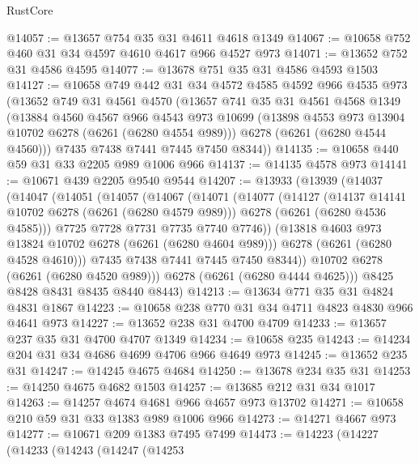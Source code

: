 \begin{lexlean}{RustCore}
\begin{coremodule}
@14057 := @13657 @754 @35 @31 @4611 @4618 @1349
@14067 := @10658 @752 @460 @31 @34 @4597 @4610 @4617 @966 @4527 @973
@14071 := @13652 @752 @31 @4586 @4595
@14077 := @13678 @751 @35 @31 @4586 @4593 @1503
@14127 := @10658
    @749
    @442
    @31
    @34
    @4572
    @4585
    @4592
    @966
    @4535
    @973
    (@13652
      @749
      @31
      @4561
      @4570
      (@13657
        @741
        @35
        @31
        @4561
        @4568
        @1349
        (@13884
          @4560
          @4567
          @966
          @4543
          @973
          @10699
          (@13898 @4553 @973 @13904 @10702 @6278 (@6261 (@6280 @4554 @989)))
          @6278
          (@6261 (@6280 @4544 @4560)))
        @7435
        @7438
        @7441
        @7445
        @7450
        @8344))
@14135 := @10658 @440 @59 @31 @33 @2205 @989 @1006 @966
@14137 := @14135 @4578 @973
@14141 := @10671 @439 @2205 @9540 @9544
@14207 := @13933
    (@13939
      (@14037
        (@14047
          (@14051
            (@14057
              (@14067
                (@14071
                  (@14077
                    (@14127
                      (@14137 @14141 @10702 @6278 (@6261 (@6280 @4579 @989)))
                      @6278
                      (@6261 (@6280 @4536 @4585)))
                    @7725
                    @7728
                    @7731
                    @7735
                    @7740
                    @7746))
                (@13818 @4603 @973 @13824 @10702 @6278 (@6261 (@6280 @4604 @989)))
                @6278
                (@6261 (@6280 @4528 @4610)))
              @7435
              @7438
              @7441
              @7445
              @7450
              @8344))
          @10702
          @6278
          (@6261 (@6280 @4520 @989)))
        @6278
        (@6261 (@6280 @4444 @4625)))
      @8425
      @8428
      @8431
      @8435
      @8440
      @8443)
@14213 := @13634 @771 @35 @31 @4824 @4831 @1867
@14223 := @10658 @238 @770 @31 @34 @4711 @4823 @4830 @966 @4641 @973
@14227 := @13652 @238 @31 @4700 @4709
@14233 := @13657 @237 @35 @31 @4700 @4707 @1349
@14234 := @10658 @235
@14243 := @14234 @204 @31 @34 @4686 @4699 @4706 @966 @4649 @973
@14245 := @13652 @235 @31
@14247 := @14245 @4675 @4684
@14250 := @13678 @234 @35 @31
@14253 := @14250 @4675 @4682 @1503
@14257 := @13685 @212 @31 @34 @1017
@14263 := @14257 @4674 @4681 @966 @4657 @973 @13702
@14271 := @10658 @210 @59 @31 @33 @1383 @989 @1006 @966
@14273 := @14271 @4667 @973
@14277 := @10671 @209 @1383 @7495 @7499
@14473 := @14223
    (@14227
      (@14233
        (@14243
          (@14247
            (@14253

\end{coremodule}
\end{lexlean}
